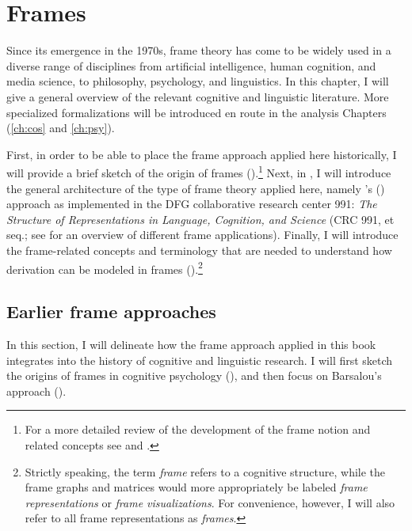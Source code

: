 \chapter{Frames}
\label{ch:frames}

Since its emergence in the 1970s, frame theory has come to be widely used in a diverse range of disciplines from artificial intelligence, human cognition, and media science, to philosophy, psychology, and linguistics. In this chapter, I will give a general overview of the relevant cognitive and linguistic literature. More specialized formalizations will be introduced en route in the analysis Chapters (\ref{ch:cos} and \ref{ch:psy}). 

First, in order to be able to place the frame approach applied here historically, I will provide a brief sketch of the origin of frames ().\footnote{For a more detailed review of the development of the frame notion and related concepts see \citet{Ziem.2008} and \citet{Busse.2012,Busse.2017}.}
Next, in , I will introduce the general architecture of the type of frame theory applied here, namely \citeauthor{Barsalou.1992a}'s (\citeyear{Barsalou.1992a,Barsalou.1992b}) approach as implemented in the DFG collaborative research center 991: \textit{The Structure of Representations in Language, Cognition, and Science} (CRC 991, \citealt{Petersen.2007} et seq.; see \citealt{Loebner.2021} for an overview of different frame applications). 
Finally, I will introduce the frame-related concepts and terminology that are needed to understand how derivation can be modeled in frames ().\footnote{Strictly speaking, the term \textit{frame} refers to a cognitive structure, while the frame graphs and matrices would more appropriately be labeled \textit{frame representations} or \textit{frame visualizations}. For convenience, however, I will also refer to all frame representations as \textit{frames}.} 

\section{Earlier frame approaches}
\label{sec:fr-early}

In this section, I will delineate how the frame approach applied in this book integrates into the history of cognitive and linguistic research. I will first sketch the origins of frames in cognitive psychology (), and then focus on Barsalou's approach (). 

